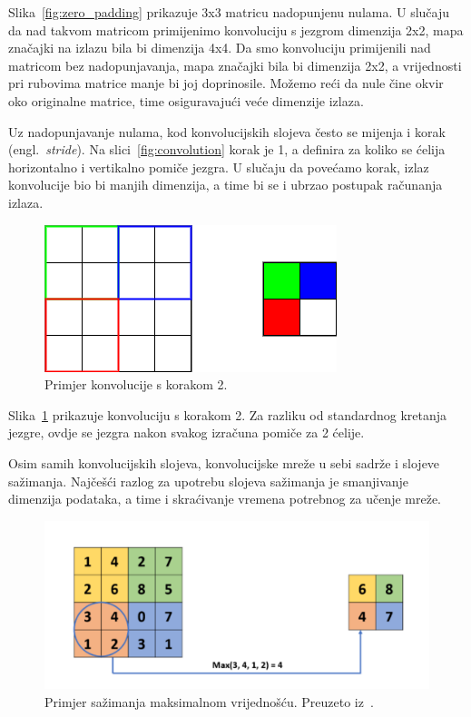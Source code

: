 \documentclass[times, utf8, zavrsni, numeric]{fer}
\begin{document}
Slika~\ref{fig:zero_padding} prikazuje 3x3 matricu nadopunjenu nulama. U slučaju da nad takvom matricom primijenimo konvoluciju s jezgrom dimenzija 2x2, mapa značajki na izlazu bila bi dimenzija 4x4.
Da smo konvoluciju primijenili nad matricom bez nadopunjavanja, mapa značajki bila bi dimenzija 2x2, a vrijednosti pri rubovima matrice manje bi joj doprinosile.
Možemo reći da nule čine okvir oko originalne matrice, time osiguravajući veće dimenzije izlaza.

\pagebreak

Uz nadopunjavanje nulama, kod konvolucijskih slojeva često se mijenja i korak (engl.\ \textit{stride}). 
Na slici~\ref{fig:convolution} korak je 1, a definira za koliko se ćelija horizontalno i vertikalno pomiče jezgra. 
U slučaju da povećamo korak, izlaz konvolucije bio bi manjih dimenzija, a time bi se i ubrzao postupak računanja izlaza.
\begin{figure}[htb]
    \centering
    \includegraphics[scale=0.5]{stride.png}
    \caption{Primjer konvolucije s korakom 2.}
    \label{fig:stride}
\end{figure}

Slika~\ref{fig:stride} prikazuje konvoluciju s korakom 2. Za razliku od standardnog kretanja jezgre, ovdje se jezgra nakon svakog izračuna pomiče za 2 ćelije. 

Osim samih konvolucijskih slojeva, konvolucijske mreže u sebi sadrže i slojeve sažimanja. 
Najčešći razlog za upotrebu slojeva sažimanja je smanjivanje dimenzija podataka, a time i skraćivanje vremena potrebnog za učenje mreže.

\begin{figure}[htb]
    \centering
    \includegraphics[scale=0.35]{maxpool.png}
    \caption{Primjer sažimanja maksimalnom vrijednošću. Preuzeto iz~\cite{gholamalinezhad2020pooling}.}
    \label{fig:maxpool}
\end{figure}
\end{document}
